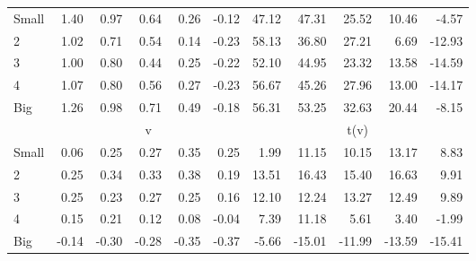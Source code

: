 \begin{table}[!ht]
\begin{tabular}{lrrrrrrrrrr}
    \\
      \cmidrule(r){2-6} \cmidrule(r){7-11}

    Small   & 1.40  & 0.97  & 0.64  & 0.26  & -0.12  & 47.12  & 47.31  & 25.52  & 10.46  & -4.57  \\
         2  & 1.02  & 0.71  & 0.54  & 0.14  & -0.23  & 58.13  & 36.80  & 27.21  & 6.69  & -12.93  \\
         3  & 1.00  & 0.80  & 0.44  & 0.25  & -0.22  & 52.10  & 44.95  & 23.32  & 13.58  & -14.59  \\
         4  & 1.07  & 0.80  & 0.56  & 0.27  & -0.23  & 56.67  & 45.26  & 27.96  & 13.00  & -14.17  \\
    Big     & 1.26  & 0.98  & 0.71  & 0.49  & -0.18  & 56.31  & 53.25  & 32.63  & 20.44  & -8.15  \\

  
    
      & \multicolumn{5}{c}{v} & \multicolumn{5}{c}{t(v)}
    
    \\
      \cmidrule(r){2-6} \cmidrule(r){7-11}

    Small   & 0.06  & 0.25  & 0.27  & 0.35  & 0.25  & 1.99  & 11.15  & 10.15  & 13.17  & 8.83  \\
         2  & 0.25  & 0.34  & 0.33  & 0.38  & 0.19  & 13.51  & 16.43  & 15.40  & 16.63  & 9.91  \\
         3  & 0.25  & 0.23  & 0.27  & 0.25  & 0.16  & 12.10  & 12.24  & 13.27  & 12.49  & 9.89  \\
         4  & 0.15  & 0.21  & 0.12  & 0.08  & -0.04  & 7.39  & 11.18  & 5.61  & 3.40  & -1.99  \\
    Big     & -0.14  & -0.30  & -0.28  & -0.35  & -0.37  & -5.66  & -15.01  & -11.99  & -13.59  & -15.41  \\

  

  \bottomrule
\end{tabular}
\label{tbl:25_Size_BM_FF1993}
\end{table}